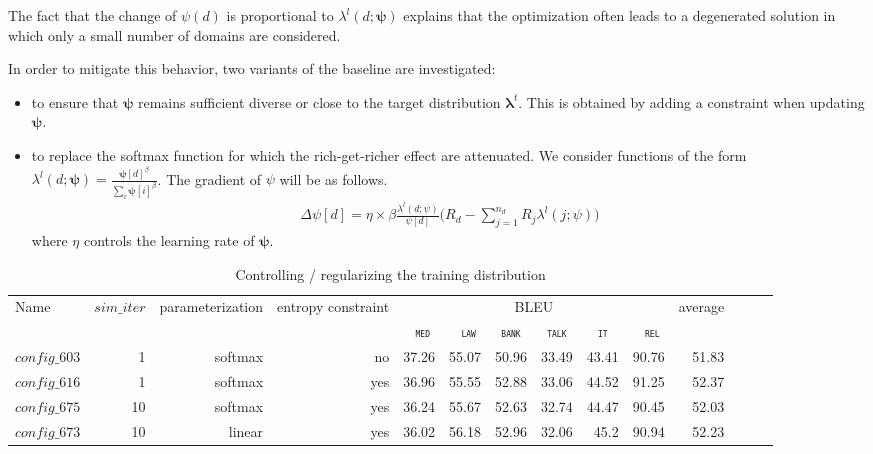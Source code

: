\documentclass[11pt,a4paper]{article}
\newcommand{\fyTodo}[1]{\Todo[FY:]{\textcolor{orange}{#1}}}
\newcommand{\domain}[1]{\texttt{\textsc{#1}}}
\newcommand{\system}[1]{\texttt{{#1}}}
\newcommand{\vlambda}{\ensuremath{\boldsymbol\lambda}\xspace} %
\newcommand{\vpsi}{\ensuremath{\boldsymbol\psi}\xspace} %
\begin{document}
The fact that the change of $\psi(d)$ is proportional to $\lambda^l(d; \vpsi)$ explains that the optimization often leads to a degenerated solution in which only a small number of domains are considered. 

In order to mitigate this behavior, two variants of the baseline are investigated:
\begin{itemize}
\item to ensure that $\vpsi$ remains sufficient diverse or close to the target distribution $\vlambda^t$. This is obtained by adding a constraint when updating $\vpsi$. 
\item to replace the softmax function for which the rich-get-richer effect are attenuated. We consider functions of the form $\lambda
^l(d;\vpsi) = \frac{\vpsi[d]^\beta}{\sum_i \vpsi[i]^\beta}$. The gradient of $\psi$ will be as follows.
\begin{align*}
\Delta\psi[d] = \eta \times \beta \frac{\lambda^l(d;\psi)}{\psi[d]} \big( R_d - \displaystyle{\mathop{\sum}_{j=1}^{n_d}} R_j \lambda^l(j;\psi) \big)
\end{align*}
where $\eta$ controls the learning rate of $\vpsi$.
\end{itemize}

\begin{table}
  \centering %
  \begin{adjustbox}{width=1.0\textwidth,center}
  \begin{tabular}{|p{2.0cm}|*{13}{r|}} \hline
    \multirow{2}{*}{Name} & \multirow{2}{*}{$sim\_iter$} & \multirow{2}{*}{parameterization} & \multirow{2}{*}{entropy constraint} & \multicolumn{6}{|c|}{BLEU} & \multirow{2}{*}{average} \\ \cline{5-10}	
   & & & & \multicolumn{1}{c|}{\domain{ med}} & \multicolumn{1}{c|}{\domain{ law}} & \multicolumn{1}{c|}{\domain{bank}} & \multicolumn{1}{c|}{\domain{talk}} & \multicolumn{1}{c|}{\domain{ it }} & \multicolumn{1}{c|}{\domain{ rel}} &  \\
    \hline
    \system{$config\_603$} & 1 & softmax & no & 37.26& 55.07& 50.96& 33.49& 43.41& 90.76& 51.83\\
    \system{$config\_616$} & 1 & softmax & yes & 36.96& 55.55& 52.88& 33.06& 44.52& 91.25& 52.37 \\
    \system{$config\_675$} & 10 & softmax & yes & 36.24& 55.67& 52.63& 32.74& 44.47& 90.45& 52.03\\
    \system{$config\_673$} & 10 & linear & yes & 36.02& 56.18& 52.96& 32.06& 45.2 & 90.94 & 52.23 \\
  \hline
  \end{tabular}
  \end{adjustbox}
  \caption{Controlling / regularizing the training distribution}
  \label{tab:performance}
\end{table}
\end{document}
